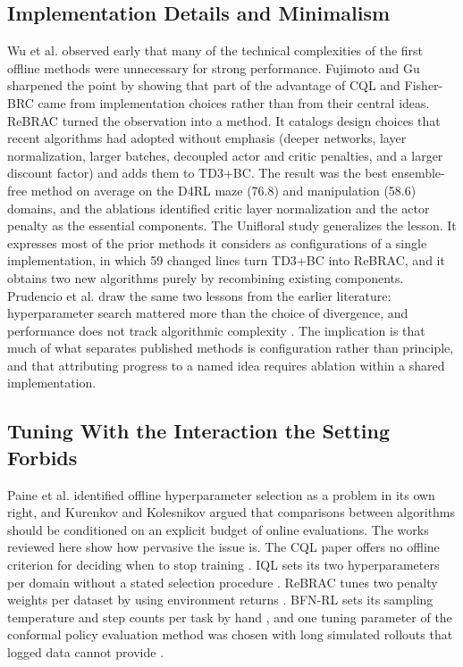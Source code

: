\documentclass[journal]{IEEEtran}
\begin{document}
\subsection{Implementation Details and Minimalism}
Wu et al. \cite{wu2019brac} observed early that many of the technical complexities of the first offline methods were unnecessary for strong performance. Fujimoto and Gu \cite{fujimoto2021td3bc} sharpened the point by showing that part of the advantage of CQL and Fisher-BRC \cite{kostrikov2021fisherbrc} came from implementation choices rather than from their central ideas. ReBRAC \cite{tarasov2023rebrac} turned the observation into a method. It catalogs design choices that recent algorithms had adopted without emphasis (deeper networks, layer normalization, larger batches, decoupled actor and critic penalties, and a larger discount factor) and adds them to TD3+BC. The result was the best ensemble-free method on average on the D4RL maze (76.8) and manipulation (58.6) domains, and the ablations identified critic layer normalization and the actor penalty as the essential components. The Unifloral study \cite{jackson2025unifloral} generalizes the lesson. It expresses most of the prior methods it considers as configurations of a single implementation, in which 59 changed lines turn TD3+BC into ReBRAC, and it obtains two new algorithms purely by recombining existing components. Prudencio et al. draw the same two lessons from the earlier literature: hyperparameter search mattered more than the choice of divergence, and performance does not track algorithmic complexity \cite{prudencio2024survey}. The implication is that much of what separates published methods is configuration rather than principle, and that attributing progress to a named idea requires ablation within a shared implementation.

\subsection{Tuning With the Interaction the Setting Forbids}
Paine et al. \cite{paine2020hyperparameter} identified offline hyperparameter selection as a problem in its own right, and Kurenkov and Kolesnikov \cite{kurenkov2022budget} argued that comparisons between algorithms should be conditioned on an explicit budget of online evaluations. The works reviewed here show how pervasive the issue is. The CQL paper offers no offline criterion for deciding when to stop training \cite{kumar2020cql}. IQL sets its two hyperparameters per domain without a stated selection procedure \cite{kostrikov2022iql}. ReBRAC tunes two penalty weights per dataset by using environment returns \cite{tarasov2023rebrac}. BFN-RL sets its sampling temperature and step counts per task by hand \cite{killingberg2026bfn}, and one tuning parameter of the conformal policy evaluation method was chosen with long simulated rollouts that logged data cannot provide \cite{gan2025conformal}.
\end{document}
